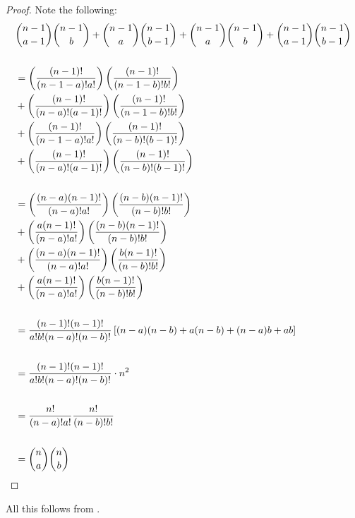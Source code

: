 \documentclass[12pt,leqno]{article}
\theoremstyle{remark}
\begin{document}
\vspace{.5cm}

\begin{proof}
Note the following:\\
\begin{align*}
&\binom{n-1}{a-1}\binom{n-1}{b}+\binom{n-1}{a}\binom{n-1}{b-1}+\binom{n-1}{a}\binom{n-1}{b}+\binom{n-1}{a-1}\binom{n-1}{b-1}\\\\
&=\left(\frac{(n-1)!}{(n-1-a)!a!}\right)\left(\frac{(n-1)!}{(n-1-b)!b!}\right)\\
&+\left(\frac{(n-1)!}{(n-a)!(a-1)!}\right)\left(\frac{(n-1)!}{(n-1-b)!b!}\right)\\
&+\left(\frac{(n-1)!}{(n-1-a)!a!}\right)\left(\frac{(n-1)!}{(n-b)!(b-1)!}\right)\\
&+\left(\frac{(n-1)!}{(n-a)!(a-1)!}\right)\left(\frac{(n-1)!}{(n-b)!(b-1)!}\right)\\\\
&=\left(\frac{(n-a)(n-1)!}{(n-a)!a!}\right)\left(\frac{(n-b)(n-1)!}{(n-b)!b!}\right)\\
&+\left(\frac{a(n-1)!}{(n-a)!a!}\right)\left(\frac{(n-b)(n-1)!}{(n-b)!b!}\right)\\
&+\left(\frac{(n-a)(n-1)!}{(n-a)!a!}\right)\left(\frac{b(n-1)!}{(n-b)!b!}\right)\\
&+\left(\frac{a(n-1)!}{(n-a)!a!}\right)\left(\frac{b(n-1)!}{(n-b)!b!}\right)\\\\
&=\frac{(n-1)!(n-1)!}{a!b!(n-a)!(n-b)!}\left[(n-a)(n-b)+a(n-b)+(n-a)b+ab\right]\\\\
&=\frac{(n-1)!(n-1)!}{a!b!(n-a)!(n-b)!}\cdot n^{2}\\\\
&=\frac{n!}{(n-a)!a!}\frac{n!}{(n-b)!b!}\\\\
&=\binom{n}{a}\binom{n}{b}   \qedhere
\end{align*} 
\end{proof}





All this follows from \cite{PW}.




\clearpage
\end{document}
